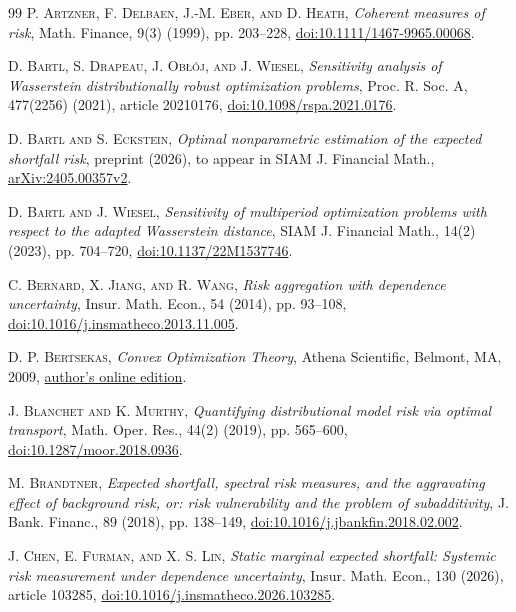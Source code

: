 \begin{thebibliography}{99}
\textsc{P. Artzner, F. Delbaen, J.-M. Eber, and D. Heath}, \emph{Coherent measures of risk}, Math. Finance, 9(3) (1999), pp. 203--228, \href{https://doi.org/10.1111/1467-9965.00068}{doi:10.1111/1467-9965.00068}.

\textsc{D. Bartl, S. Drapeau, J. Obłój, and J. Wiesel}, \emph{Sensitivity analysis of Wasserstein distributionally robust optimization problems}, Proc. R. Soc. A, 477(2256) (2021), article 20210176, \href{https://doi.org/10.1098/rspa.2021.0176}{doi:10.1098/rspa.2021.0176}.

\textsc{D. Bartl and S. Eckstein}, \emph{Optimal nonparametric estimation of the expected shortfall risk}, preprint (2026), to appear in SIAM J. Financial Math., \href{https://arxiv.org/abs/2405.00357v2}{arXiv:2405.00357v2}.

\textsc{D. Bartl and J. Wiesel}, \emph{Sensitivity of multiperiod optimization problems with respect to the adapted Wasserstein distance}, SIAM J. Financial Math., 14(2) (2023), pp. 704--720, \href{https://doi.org/10.1137/22M1537746}{doi:10.1137/22M1537746}.

\textsc{C. Bernard, X. Jiang, and R. Wang}, \emph{Risk aggregation with dependence uncertainty}, Insur. Math. Econ., 54 (2014), pp. 93--108, \href{https://doi.org/10.1016/j.insmatheco.2013.11.005}{doi:10.1016/j.insmatheco.2013.11.005}.

\textsc{D. P. Bertsekas}, \emph{Convex Optimization Theory}, Athena Scientific, Belmont, MA, 2009, \href{https://web.mit.edu/dimitrib/www/Convex_Theory_Entire_Book.pdf}{author's online edition}.

\textsc{J. Blanchet and K. Murthy}, \emph{Quantifying distributional model risk via optimal transport}, Math. Oper. Res., 44(2) (2019), pp. 565--600, \href{https://doi.org/10.1287/moor.2018.0936}{doi:10.1287/moor.2018.0936}.

\textsc{M. Brandtner}, \emph{Expected shortfall, spectral risk measures, and the aggravating effect of background risk, or: risk vulnerability and the problem of subadditivity}, J. Bank. Financ., 89 (2018), pp. 138--149, \href{https://doi.org/10.1016/j.jbankfin.2018.02.002}{doi:10.1016/j.jbankfin.2018.02.002}.

\textsc{J. Chen, E. Furman, and X. S. Lin}, \emph{Static marginal expected shortfall: Systemic risk measurement under dependence uncertainty}, Insur. Math. Econ., 130 (2026), article 103285, \href{https://doi.org/10.1016/j.insmatheco.2026.103285}{doi:10.1016/j.insmatheco.2026.103285}.


\end{thebibliography}
